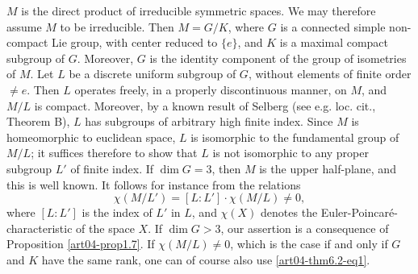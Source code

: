 $M$ is the direct product of irreducible symmetric spaces. We may therefore assume $M$ to be irreducible. Then $M=G/K$, where $G$ is a connected simple non-compact Lie group, with center reduced to $\{e\}$, and $K$ is a maximal compact subgroup of $G$. Moreover, $G$ is the identity component of the group of isometries of $M$. Let $L$ be a discrete uniform subgroup of $G$, without elements of finite order $\neq e$. Then $L$ operates freely, in a properly discontinuous manner, on $M$, and $M/L$ is compact. Moreover, by a known result of Selberg (see e.g. loc. cit., Theorem B), $L$ has subgroups of arbitrary high finite index. Since $M$ is homeomorphic to euclidean space, $L$ is isomorphic to the fundamental group of $M/L$; it suffices therefore to show that $L$ is not isomorphic to any proper subgroup $L'$ of finite index. If $\dim G=3$, then $M$ is the upper half-plane, and this is well known. It follows for instance from the relations
\begin{equation*}
\chi(M/L')=[L:L']\cdot \chi (M/L)\neq 0,\tag{1}\label{art04-thm6.2-eq1}
\end{equation*}
where $[L:L']$ is the index of $L'$ in $L$, and $\chi(X)$ denotes the Euler-Poincar\'e-characteristic of the space $X$. If $\dim G>3$, our assertion is a consequence of Proposition \ref{art04-prop1.7}. If $\chi(M/L)\neq 0$, which is the case if and only if $G$ and $K$ have the same rank, one can of course also use \eqref{art04-thm6.2-eq1}.

